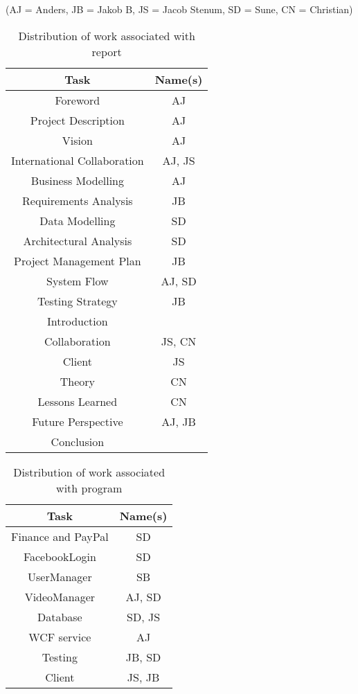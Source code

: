 \label{Distribution of Work}
(AJ = Anders, JB = Jakob B, JS = Jacob Stenum, SD = Sune, CN = Christian)\\
\begin{table}[H]
\caption{Distribution of work associated with report}
\centering

\begin{tabular}{c c}
Task & Name(s) \\ [1.5ex] 
\hline
Foreword & AJ \\
Project Description & AJ \\
Vision & AJ\\
International Collaboration &  AJ, JS \\
Business Modelling & AJ \\
Requirements Analysis & JB\\
Data Modelling & SD \\
Architectural Analysis & SD \\
Project Management Plan & JB \\
System Flow & AJ, SD\\
Testing Strategy & JB\\
Introduction & \\
Collaboration & JS, CN \\
Client & JS \\
Theory & CN \\
Lessons Learned & CN\\
Future Perspective & AJ, JB \\
Conclusion & \\

\end{tabular}
\end{table}
\newpage
\begin{table}[H]
\caption{Distribution of work associated with program}
\centering
\begin{tabular}{c c}
Task & Name(s)\\ [1.5ex] 
\hline
Finance and PayPal & SD \\
FacebookLogin & SD \\
UserManager & SB \\
VideoManager & AJ, SD \\
Database & SD, JS \\
WCF service & AJ\\
Testing & JB, SD \\
Client & JS, JB\\


\end{tabular}
\end{table}

